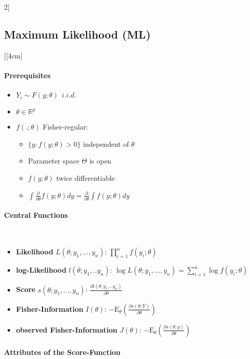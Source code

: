 \documentclass[8pt]{extarticle}
\begin{document}
\begin{multicols}{2}[\subsection{Maximum Likelihood (ML)}][4cm]
  \paragraph{Prerequisites}
  
  \begin{itemize}
  \item $Y_i \sim F(y;\theta)\:\: i.i.d.$
  \item $\theta \in \mathbb{R}^p$
  \item $f(.;\theta)$ Fisher-regular:
  \begin{itemize}
  \item $\{ y: f (y; \theta)> 0 \}$ independent of $\theta$
  \item Parameter space $\Theta$ is open
  \item $f(y;\theta)$ twice differentiable
  \item $\int \frac{\partial}{\partial \theta} f(y;\theta)dy = \frac{\partial}{\partial \theta} \int f(y;\theta)dy$
  \end{itemize}
  \end{itemize}
  
  \paragraph{Central Functions} \ \\
  \begin{itemize}
  \item \textbf{Likelihood} $L(\theta;y_1,...,y_n)$: $\prod_{i=1}^n f(y_i;\theta)$
  \item \textbf{log-Likelihood} $l(\theta;y_1,..y_n)$: 
$\log L(\theta;y_1,...,y_n) = \sum_{i=1}^n \log f(y_i;\theta)$
  \item \textbf{Score} $s(\theta;y_1,...,y_n)$: $\frac{\partial l(\theta;y_1,..y_n)}{\partial \theta}$
  \item \textbf{Fisher-Information} $I(\theta)$: $-\mathrm{E}_\theta\left(\frac{\partial s(\theta;Y)}{\partial\theta}\right)$
  \item \textbf{observed Fisher-Information} $J(\theta)$: $-\mathrm{E}_\theta\left(\frac{\partial s(\theta;y)}{\partial\theta}\right)$
  \end{itemize}
  
  
  \paragraph{Attributes of the Score-Function} \ \\
  

\end{multicols}
\end{document}
